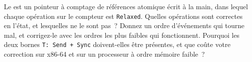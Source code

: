 \begin{question}\label{iq:iv3:low-latency:35}
Le  est un pointeur à comptage de références atomique écrit à la main, dans lequel chaque opération sur le compteur est \texttt{Relaxed}. Quelles opérations sont correctes en l'état, et lesquelles ne le sont pas~? Donnez un ordre d'événements qui tourne mal, et corrigez-le avec les ordres les plus faibles qui fonctionnent. Pourquoi les deux bornes \texttt{T: Send + Sync} doivent-elles être présentes, et que coûte votre correction sur x86-64 et sur un processeur à ordre mémoire faible~?
\label{lst:iv3:ll:myarc}
\end{question}
